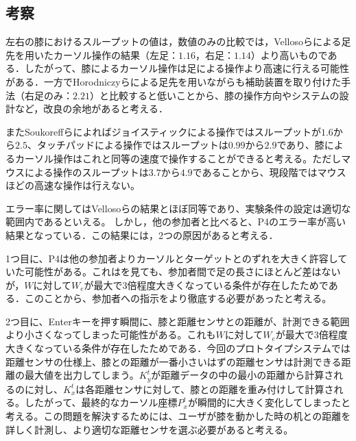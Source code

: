 \documentclass[submit, techrep]{ipsj}
\begin{document}
\subsection{考察}
左右の膝におけるスループットの値は，数値のみの比較では，Vellosoら\cite{velloso:hal-01599657}による足先を用いたカーソル操作の結果（左足：$1.16$，右足：$1.14$）より高いものである．したがって、膝によるカーソル操作は足による操作より高速に行える可能性がある．一方でHorodniczyら\cite{Horodniczy:2017:FHE:3025453.3025625}による足先を用いながらも補助装置を取り付けた手法（右足のみ：$2.21$）と比較すると低いことから、膝の操作方向やシステムの設計など，改良の余地があると考える．\par
またSoukoreffらによれば\cite{Soukoreff:2004:TSP:1056153.1056155}ジョイスティックによる操作ではスループットが$1.6$から$2.5$、タッチパッドによる操作ではスループットは$0.99$から$2.9$であり、膝によるカーソル操作はこれと同等の速度で操作することができると考える。ただしマウスによる操作のスループットは$3.7$から$4.9$であることから、現段階ではマウスほどの高速な操作は行えない。\par
エラー率に関してはVellosoら\cite{velloso:hal-01599657}の結果とほぼ同等であり、実験条件の設定は適切な範囲内であるといえる。
しかし，他の参加者と比べると、P4のエラー率が高い結果となっている．この結果には，2つの原因があると考える．\par
1つ目に、P4は他の参加者よりカーソルとターゲットとのずれを大きく許容していた可能性がある。これはを見ても、参加者間で足の長さにほとんど差はないが，$W$に対して$W_e$が最大で3倍程度大きくなっている条件が存在したためである．このことから、参加者への指示をより徹底する必要があったと考える。\par
2つ目に、Enterキーを押す瞬間に、膝と距離センサとの距離が、計測できる範囲より小さくなってしまった可能性がある。これも$W$に対して$W_e$が最大で3倍程度大きくなっている条件が存在したためである．今回のプロトタイプシステムでは距離センサの仕様上、膝との距離が一番小さいはずの距離センサは計測できる距離の最大値を出力してしまう。$K^t_y$が距離データの中の最小の距離から計算されるのに対し、$K^t_x$は各距離センサに対して、膝との距離を重み付けして計算される。したがって、最終的なカーソル座標$P^t_x$が瞬間的に大きく変化してしまったと考える。この問題を解決するためには、ユーザが膝を動かした時の机との距離を詳しく計測し、より適切な距離センサを選ぶ必要があると考える。
\end{document}
